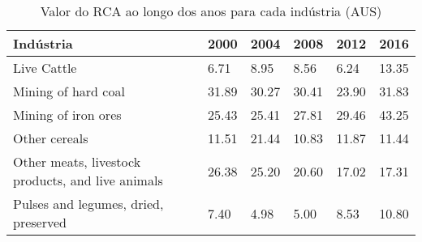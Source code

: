 \begin{table}
\centering
\caption{Valor do RCA ao longo dos anos para cada indústria (AUS)}
\label{tab:ex3-tempo-AUS}
\begin{tabular}{p{6cm}p{1.5cm}p{1.5cm}p{1.5cm}p{1.5cm}p{1.5cm}}
\toprule
                                        Indústria &  2000 &  2004 &  2008 &  2012 &  2016 \\
\midrule
                                      Live Cattle &  6.71 &  8.95 &  8.56 &  6.24 & 13.35 \\
                              Mining of hard coal & 31.89 & 30.27 & 30.41 & 23.90 & 31.83 \\
                              Mining of iron ores & 25.43 & 25.41 & 27.81 & 29.46 & 43.25 \\
                                    Other cereals & 11.51 & 21.44 & 10.83 & 11.87 & 11.44 \\
Other meats, livestock products, and live animals & 26.38 & 25.20 & 20.60 & 17.02 & 17.31 \\
             Pulses and legumes, dried, preserved &  7.40 &  4.98 &  5.00 &  8.53 & 10.80 \\
\bottomrule
\end{tabular}
\end{table}
